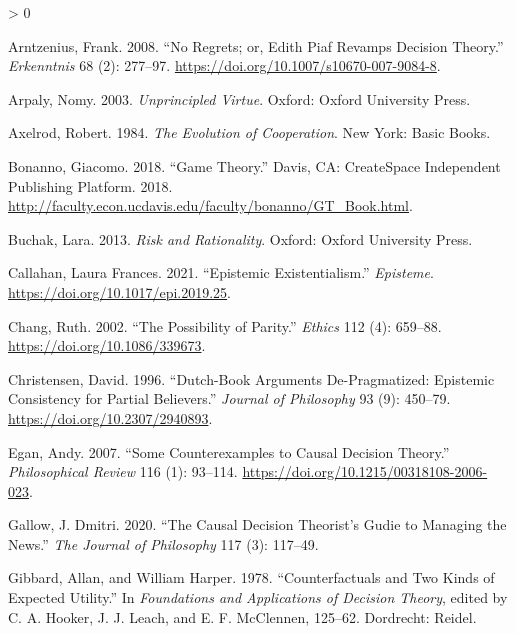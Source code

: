 \documentclass[
  12pt,
]{article}
\newlength{\cslhangindent}
\newenvironment{CSLReferences}[2] %
 {%
  \setlength{\parindent}{0pt}
  \ifodd #1 \everypar{\setlength{\hangindent}{\cslhangindent}}\ignorespaces\fi
  \ifnum #2 > 0
  \setlength{\parskip}{#2\baselineskip}
  \fi
 }%
 {}
\begin{document}
\hypertarget{refs}{}
\begin{CSLReferences}{1}{0}
\leavevmode\hypertarget{ref-Arntzenius2008}{}%
Arntzenius, Frank. 2008. {``No Regrets; or, Edith Piaf Revamps Decision
Theory.''} \emph{Erkenntnis} 68 (2): 277--97.
\url{https://doi.org/10.1007/s10670-007-9084-8}.

\leavevmode\hypertarget{ref-Arpaly2003}{}%
Arpaly, Nomy. 2003. \emph{Unprincipled Virtue}. Oxford: Oxford
University Press.

\leavevmode\hypertarget{ref-Axelrod1984}{}%
Axelrod, Robert. 1984. \emph{The Evolution of Cooperation}. New York:
Basic Books.

\leavevmode\hypertarget{ref-Bonanno2018}{}%
Bonanno, Giacomo. 2018. {``Game Theory.''} Davis, CA: CreateSpace
Independent Publishing Platform. 2018.
\url{http://faculty.econ.ucdavis.edu/faculty/bonanno/GT_Book.html}.

\leavevmode\hypertarget{ref-BuchakRisk}{}%
Buchak, Lara. 2013. \emph{Risk and Rationality}. Oxford: Oxford
University Press.

\leavevmode\hypertarget{ref-Callahan2021}{}%
Callahan, Laura Frances. 2021. {``Epistemic Existentialism.''}
\emph{Episteme}. \url{https://doi.org/10.1017/epi.2019.25}.

\leavevmode\hypertarget{ref-Chang2002}{}%
Chang, Ruth. 2002. {``The Possibility of Parity.''} \emph{Ethics} 112
(4): 659--88. \url{https://doi.org/10.1086/339673}.

\leavevmode\hypertarget{ref-Christensen1996}{}%
Christensen, David. 1996. {``Dutch-Book Arguments {D}e-Pragmatized:
Epistemic Consistency for Partial Believers.''} \emph{Journal of
Philosophy} 93 (9): 450--79. \url{https://doi.org/10.2307/2940893}.

\leavevmode\hypertarget{ref-Egan2007-EGASCT}{}%
Egan, Andy. 2007. {``{Some Counterexamples to Causal Decision
Theory}.''} \emph{Philosophical Review} 116 (1): 93--114.
\url{https://doi.org/10.1215/00318108-2006-023}.

\leavevmode\hypertarget{ref-Gallow2020}{}%
Gallow, J. Dmitri. 2020. {``The Causal Decision Theorist's Gudie to
Managing the News.''} \emph{The Journal of Philosophy} 117 (3): 117--49.

\leavevmode\hypertarget{ref-GibbardHarper1978}{}%
Gibbard, Allan, and William Harper. 1978. {``Counterfactuals and Two
Kinds of Expected Utility.''} In \emph{Foundations and Applications of
Decision Theory}, edited by C. A. Hooker, J. J. Leach, and E. F.
McClennen, 125--62. Dordrecht: Reidel.


\end{CSLReferences}
\end{document}
